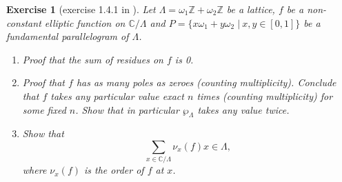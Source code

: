 \documentclass[titlepage,a4paper]{article}
\theoremstyle{theoremdd}
\theoremstyle{definitiondd}
\theoremstyle{remarkdd}
\newtheorem{exercise}[theorem]{Exercise}
\newcommand{\Z}{\mathbb{Z}}
\newcommand{\C}{\mathbb{C}}
\begin{document}
\begin{exercise}[exercise 1.4.1 in \cite{diamondFirstCourseModular2005a}] \label{ex:1.4.1}
	Let $\Lambda = \omega_1 \Z + \omega_2 \Z$ be a lattice,  $f$ be a non-constant elliptic function on $\C / \Lambda$ and $P = \{x \omega_1 + y\omega_2 \;|\: x, y \in [0,1]\} $ be a fundamental parallelogram of $\Lambda$.
	 \begin{enumerate}
		\item Proof that the sum of residues on $f$ is 0. 
		\item Proof that $f$ has as many poles as zeroes (counting multiplicity). 
			Conclude that $f$ takes any particular value exact  $n$ times (counting multiplicity) for some fixed $n$. Show that in particular  $\wp_\Lambda$ takes any value twice.
		\item Show that 
			\[
				\sum_{x \in \C / \Lambda} \nu_x(f) x \in \Lambda
			,\]
			where $\nu_x(f)$ is the order of $f$ at  $x$. 
	\end{enumerate}
\end{exercise}
\end{document}
